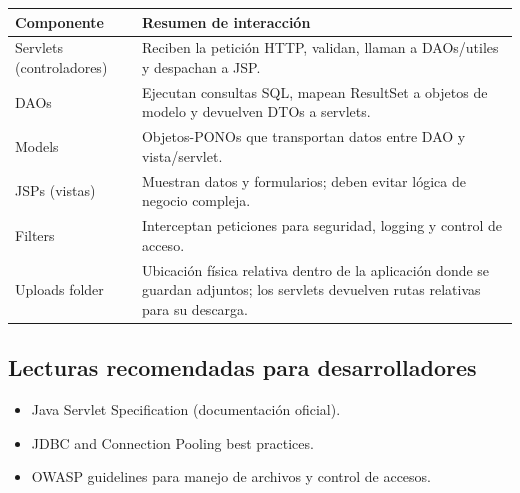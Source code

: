 \documentclass[12pt,letterpaper]{article}
\begin{document}
\begin{longtable}{|p{}|p{}|}
\hline
Componente & Resumen de interacción \\
\hline
Servlets (controladores) & Reciben la petición HTTP, validan, llaman a DAOs/utiles y despachan a JSP. \\
\hline
DAOs & Ejecutan consultas SQL, mapean ResultSet a objetos de modelo y devuelven DTOs a servlets. \\
\hline
Models & Objetos-PONOs que transportan datos entre DAO y vista/servlet. \\
\hline
JSPs (vistas) & Muestran datos y formularios; deben evitar lógica de negocio compleja. \\
\hline
Filters & Interceptan peticiones para seguridad, logging y control de acceso. \\
\hline
Uploads folder & Ubicación física relativa dentro de la aplicación donde se guardan adjuntos; los servlets devuelven rutas relativas para su descarga. \\
\hline
\end{longtable}

\vspace{0.5cm}
\subsection*{Lecturas recomendadas para desarrolladores}
\begin{itemize}
    \item Java Servlet Specification (documentación oficial).
    \item JDBC and Connection Pooling best practices.
    \item OWASP guidelines para manejo de archivos y control de accesos.
\end{itemize}
\end{document}
